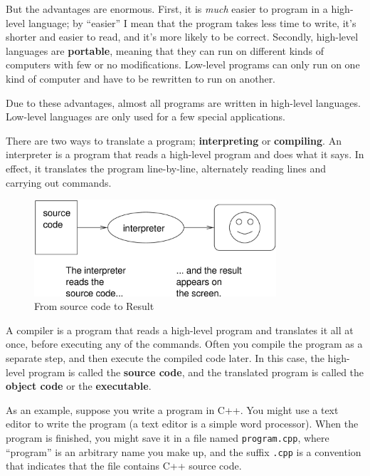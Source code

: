 But the advantages are enormous.  First,
it is {\em much} easier to program in a high-level language;
by ``easier'' I mean that the program takes less time to write,
it's shorter and easier to read, and it's more likely to be
correct.  Secondly, high-level languages are {\bf portable},
meaning that they can run on different kinds of computers with
few or no modifications.  Low-level programs can only run
on one kind of computer and have to be rewritten to run on
another.

Due to these advantages, almost all programs are written in
high-level languages.  Low-level languages are only used for
a few special applications.


There are two ways to translate a program; {\bf interpreting} or {\bf
compiling}.  An interpreter is a program that reads a high-level
program and does what it says.  In effect, it translates the program
line-by-line, alternately reading lines and carrying out commands.

\vspace{0.1in}
\begin{figure}[h]
    \centering
    \includegraphics[width=9cm]{oldimages/interpret.png}
    \caption{From source code to Result}
    \label{fig:throughinterpret}
\end{figure}
\vspace{0.1in}

A compiler is a program that reads a high-level program and
translates it all at once, before executing any of the commands.
Often you compile the program as a separate step, and then
execute the compiled code later.  In this case, the high-level
program is called the {\bf source code}, and the translated
program is called the {\bf object code} or the {\bf executable}.

As an example, suppose you write a program in C++.  You might
use a text editor to write the program (a text editor is
a simple word processor).  When the program is finished, you
might save it in a file named {\tt program.cpp}, where ``program''
is an arbitrary name you make up, and the suffix {\tt .cpp} is
a convention that indicates that the file contains C++ source
code.

